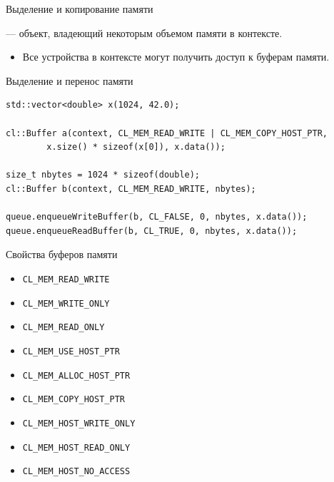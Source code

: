 \documentclass[@BEAMER_OPTIONS@]{beamer}
\newcommand{\code}[1]{\lstinline|#1|}
\begin{document}
\begin{frame}[fragile]{Выделение и копирование памяти}
    \begin{description}[\;\;]
        \item[Буфер памяти] --- объект, владеющий некоторым объемом памяти в
            контексте.
            \begin{itemize}
                \item Все устройства в контексте могут получить доступ к
                    буферам памяти.
            \end{itemize}
    \end{description}
    \begin{exampleblock}{Выделение и перенос памяти}
        \begin{lstlisting}
std::vector<double> x(1024, 42.0);

cl::Buffer a(context, CL_MEM_READ_WRITE | CL_MEM_COPY_HOST_PTR,
        x.size() * sizeof(x[0]), x.data());

size_t nbytes = 1024 * sizeof(double);
cl::Buffer b(context, CL_MEM_READ_WRITE, nbytes);

queue.enqueueWriteBuffer(b, CL_FALSE, 0, nbytes, x.data());
queue.enqueueReadBuffer(b, CL_TRUE, 0, nbytes, x.data());
        \end{lstlisting}
    \end{exampleblock}
\end{frame}

\begin{frame}[fragile]{Свойства буферов памяти}
    \begin{itemize}
        \item \code{CL_MEM_READ_WRITE}
        \item \code{CL_MEM_WRITE_ONLY}
        \item \code{CL_MEM_READ_ONLY}
            \vspace{\baselineskip}
        \item \code{CL_MEM_USE_HOST_PTR}
        \item \code{CL_MEM_ALLOC_HOST_PTR}
        \item \code{CL_MEM_COPY_HOST_PTR}
            \vspace{\baselineskip}
        \item \code{CL_MEM_HOST_WRITE_ONLY}
        \item \code{CL_MEM_HOST_READ_ONLY}
        \item \code{CL_MEM_HOST_NO_ACCESS}
    \end{itemize}
\end{frame}
\end{document}
